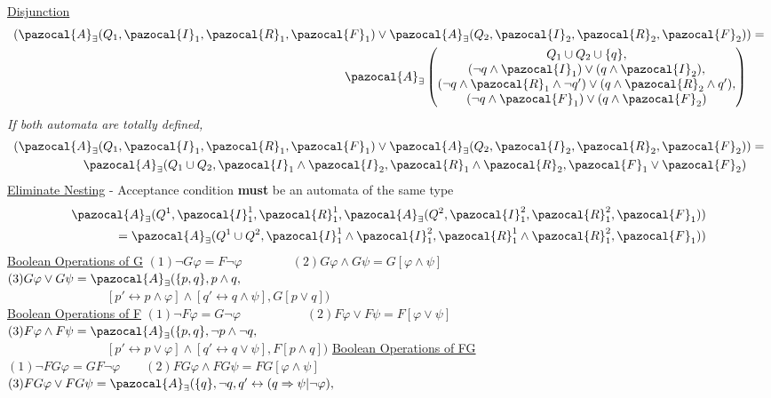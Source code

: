 \documentclass{article}
\newcommand{\Ib}{\pazocal{I}}
\newcommand{\Rb}{\pazocal{R}}
\newcommand{\Ab}{\pazocal{A}}
\newcommand{\Fb}{\pazocal{F}}
\begin{document}
\begin{multicols}{4}
\underline{Disjunction}
\begin{align*}
(\Ab_{\exists}(Q_1,\Ib_1,\Rb_1,\Fb_1)\vee \Ab_{\exists}(Q_2,\Ib_2,\Rb_2,\Fb_2)&)=\\
\Ab_{\exists} \begin{pmatrix}
Q_1 \cup Q_2 \cup \{q\},\\
(\neg q \wedge \Ib_1) \vee (q \wedge \Ib_2), \\
(\neg q \wedge \Rb_1 \wedge \neg q') \vee ( q \wedge \Rb_2 \wedge q'), \\
(\neg q \wedge \Fb_1) \vee (q \wedge \Fb_2)
  \end{pmatrix}
\end{align*}
\textit{If both automata are totally defined,}
\begin{align*}
(\Ab_{\exists}(Q_1,\Ib_1,\Rb_1,\Fb_1)\vee \Ab_{\exists}(Q_2,\Ib_2,\Rb_2,\Fb_2)&)=\\
\Ab_{\exists}(Q_1 \cup Q_2,\Ib_1 \wedge \Ib_2,\Rb_1 \wedge \Rb_2,\Fb_1 \vee \Fb_2)
\end{align*}
\underline{Eliminate Nesting} - Acceptance condition \textbf{must} be an automata of the same type
\begin{align*}
\Ab_{\exists}(Q^1,\Ib_1^1,\Rb_1^1,\Ab_{\exists}(Q^2,\Ib_1^2,\Rb_1^2,\Fb_1))\\
= \Ab_{\exists}(Q^1 \cup Q^2,\Ib_1^1 \wedge \Ib_1^2,\Rb_1^1 \wedge \Rb_1^2,\Fb_1))
\end{align*}
\underline{Boolean Operations of G}
$(1)\neg G \varphi = F \neg \varphi\qquad \qquad  (2)G \varphi \wedge G \psi = G[\varphi \wedge \psi]$\\
$(3) G \varphi \vee G \psi = \Ab_{\exists}(\{p,q\},p \wedge q,\qquad\qquad$\\
$\qquad\qquad\qquad\qquad[p' \leftrightarrow p \wedge \varphi] \wedge [q' \leftrightarrow q \wedge \psi],G[p \vee q])$\\
\underline{Boolean Operations of F}
$(1)\neg F \varphi = G \neg \varphi\qquad \qquad\quad\;(2)F \varphi \vee F \psi = F[\varphi \vee \psi]$\\
$(3) F \varphi \wedge F \psi = \Ab_{\exists}(\{p,q\}, \neg p \wedge \neg q,\qquad\qquad$\\
$\qquad\qquad\qquad\qquad[p' \leftrightarrow p \vee \varphi] \wedge [q' \leftrightarrow q \vee \psi],F[p \wedge q])$
\underline{Boolean Operations of FG}
$(1)\neg FG \varphi = GF \neg \varphi\qquad(2)FG \varphi \wedge FG \psi = FG[\varphi \wedge \psi]$ \\
$(3) FG \varphi \vee FG \psi = \Ab_{\exists}(\{q\}, \neg q, q' \leftrightarrow (q \Rightarrow \psi | \neg \varphi),$\\

\end{multicols}
\end{document}
